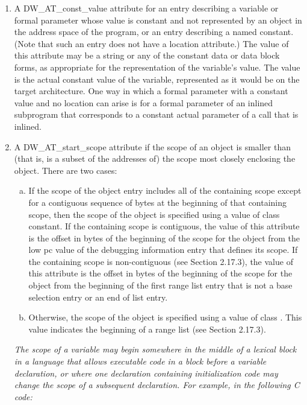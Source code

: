 \begin{enumerate}[1.]
\item A DW\_AT\_const\_value attribute for an entry describing a
variable or formal parameter whose value is constant and not
represented by an object in the address space of the program,
or an entry describing a named constant. (Note that such
an entry does not have a location attribute.) The value of
this attribute may be a string or any of the constant data
or data block forms, as appropriate for the representation
of the variable’s value. The value is the actual constant
value of the variable, represented as it would be on the
target architecture.  One way in which a formal parameter
with a constant value and no location can arise is for a
formal parameter of an inlined subprogram that corresponds
to a constant actual parameter of a call that is inlined.

\item A DW\_AT\_start\_scope attribute if the scope of an
object is smaller than (that is, is a subset of the addresses
of) the scope most closely enclosing the object. There are
two cases:
\begin{enumerate}[a)]
\item If the scope of the object entry includes all of the
containing scope except for a contiguous sequence of bytes at
the beginning of that containing scope, then the scope of the
object is specified using a value of class constant. If the
containing scope is contiguous, the value of this attribute
is the offset in bytes of the beginning of the scope for the
object from the low pc value of the debugging information
entry that defines its scope. If the containing scope
is non-contiguous (see Section 2.17.3), the value of this
attribute is the offset in bytes of the beginning of the scope
for the object from the beginning of the first range list entry
that is not a base selection entry or an end of list entry.

\item Otherwise, the scope of the object is specified using
a value of class . This value indicates the
beginning of a range list (see Section 2.17.3).
\end{enumerate}


\textit{The scope of a variable may begin somewhere in the middle of
a lexical block in a language that allows executable code in a
block before a variable declaration, or where one declaration
containing initialization code may change the scope of a
subsequent declaration.  For example, in the following C code:}


\end{enumerate}
